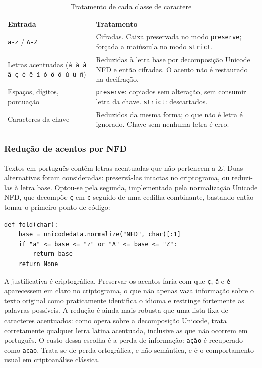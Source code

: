 \documentclass[conference]{IEEEtran}
\begin{document}
\begin{table}[htbp]
\caption{Tratamento de cada classe de caractere}
\label{tab:alfabeto}
\centering
\footnotesize
\begin{tabular}{@{}p{}p{}@{}}
\toprule
\textbf{Entrada} & \textbf{Tratamento} \\
\midrule
\texttt{a-z} / \texttt{A-Z} &
Cifradas. Caixa preservada no modo \texttt{preserve}; forçada a maiúscula no
modo \texttt{strict}. \\
\addlinespace
Letras acentuadas
(\texttt{á à â ã ç é ê í ó ô õ ú ü ñ}) &
Reduzidas à letra base por decomposição Unicode NFD e então cifradas. O acento
não é restaurado na decifração. \\
\addlinespace
Espaços, dígitos, pontuação &
\texttt{preserve}: copiados sem alteração, sem consumir letra da chave.
\texttt{strict}: descartados. \\
\addlinespace
Caracteres da chave &
Reduzidos da mesma forma; o que não é letra é ignorado. Chave sem nenhuma
letra é erro. \\
\bottomrule
\end{tabular}
\end{table}

\subsubsection{Redução de acentos por NFD}
Textos em português contêm letras acentuadas que não pertencem a $\Sigma$.
Duas alternativas foram consideradas: preservá-las intactas no criptograma, ou
reduzi-las à letra base. Optou-se pela segunda, implementada pela
normalização Unicode NFD, que decompõe \texttt{ç} em \texttt{c} seguido de uma
cedilha combinante, bastando então tomar o primeiro ponto de código:

\begin{lstlisting}
def fold(char):
    base = unicodedata.normalize("NFD", char)[:1]
    if "a" <= base <= "z" or "A" <= base <= "Z":
        return base
    return None
\end{lstlisting}

A justificativa é criptográfica. Preservar os acentos faria com que
\texttt{ç}, \texttt{ã} e \texttt{é} aparecessem em claro no criptograma, o que
não apenas vaza informação sobre o texto original como praticamente identifica
o idioma e restringe fortemente as palavras possíveis. A redução é ainda mais
robusta que uma lista fixa de caracteres acentuados: como opera sobre a
decomposição Unicode, trata corretamente qualquer letra latina acentuada,
inclusive as que não ocorrem em português. O custo dessa escolha é a perda de
informação: \texttt{ação} é recuperado como \texttt{acao}. Trata-se de perda
ortográfica, e não semântica, e é o comportamento usual em criptoanálise
clássica.
\end{document}
